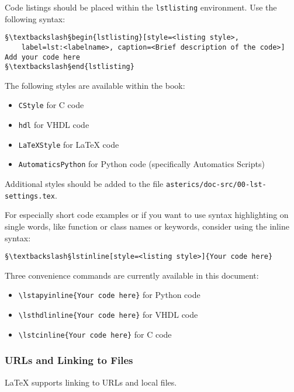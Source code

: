 Code listings should be placed within the \texttt{lstlisting} environment.
Use the following syntax:
\begin{lstlisting}[style=LaTeXStyle]
§\textbackslash§begin{lstlisting}[style=<listing style>,
	label=lst:<labelname>, caption=<Brief description of the code>]
Add your code here
§\textbackslash§end{lstlisting}
\end{lstlisting}

The following styles are available within the \asterics book:
\begin{itemize}
\setlength{\itemsep}{-0.3em}
\item \texttt{CStyle} for C code
\item \texttt{hdl} for VHDL code
\item \texttt{LaTeXStyle} for \LaTeX{} code
\item \texttt{AutomaticsPython} for Python code (specifically Automatics Scripts)
\end{itemize}
Additional styles should be added to the file \texttt{asterics/doc-src/00-lst-settings.tex}.

For especially short code examples or if you want to use syntax highlighting on single words, like function or class names or keywords, consider using the inline syntax:

\begin{lstlisting}[style=LaTeXStyle]
§\textbackslash§lstinline[style=<listing style>]{Your code here}
\end{lstlisting}

Three convenience commands are currently available in this document:
\begin{itemize}
\setlength{\itemsep}{-0.2em}
\item \texttt{{\textbackslash}lstapyinline\{Your code here\}} for Python code
\item \texttt{{\textbackslash}lsthdlinline\{Your code here\}} for VHDL code
\item \texttt{{\textbackslash}lstcinline\{Your code here\}} for C code
\end{itemize}

\subsubsection{URLs and Linking to Files}

\LaTeX{} supports linking to URLs and local files.

